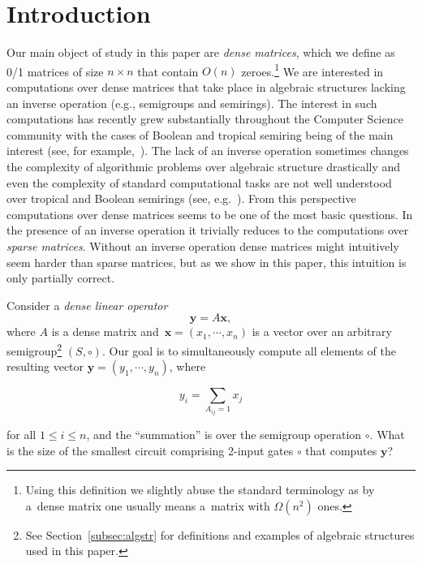 \documentclass[11pt,letterpaper]{article}
\begin{document}
\thispagestyle{empty}



\newpage

\setcounter{page}{1}


\section{Introduction}

Our main object of study in this paper are \emph{dense matrices}, which we
define as 0/1 matrices of size $n \times n$ that contain $O(n)$ zeroes.\footnote{Using this definition we slightly abuse the standard terminology as by a~dense matrix one usually means a~matrix with $\Omega(n^2)$ ones.} We are
interested in computations over dense matrices that take place in algebraic
structures lacking an inverse operation (e.g., semigroups and semirings).
The interest in such computations has recently grew substantially throughout the
Computer Science community with the cases of Boolean and tropical semiring being of the main interest (see, for
example,~\cite{Jukna16,Williams14,butkovic10systems}).
The lack of an inverse operation sometimes changes the complexity of algorithmic problems over algebraic structure drastically and even the complexity of standard computational tasks are not well understood over tropical and Boolean semirings (see, e.g.~\cite{Williams14,GrigorievP15}). From this perspective computations over dense matrices seems to be one of the most basic questions. In the presence of an inverse operation it trivially reduces to the computations over \emph{sparse matrices}.
Without an inverse operation dense matrices
might intuitively seem harder than sparse matrices, but as we show in this paper, this intuition is
only partially correct.

Consider a \emph{dense linear operator}
\[
\mathbf{y} = A\mathbf{x},
\]
where $A$ is a dense matrix and~$\mathbf{x}=(x_1, \cdots, x_n)$ is a vector over
an arbitrary semigroup\footnote{See Section~\ref{subsec:algstr} for definitions
and examples of algebraic structures used in this paper.} $(S, \circ)$. Our goal
is to simultaneously compute all elements of the resulting vector
$\mathbf{y}=(y_1, \cdots, y_n)$, where

\begin{equation}\label{eq-sum}
y_i = \sum_{A_{ij}=1} x_j
\end{equation}

\noindent
for all $1 \le i \le n$, and the ``summation'' is over the semigroup operation
$\circ$. What is the size of the smallest circuit comprising 2-input gates
$\circ$ that computes $\mathbf{y}$?
\end{document}
